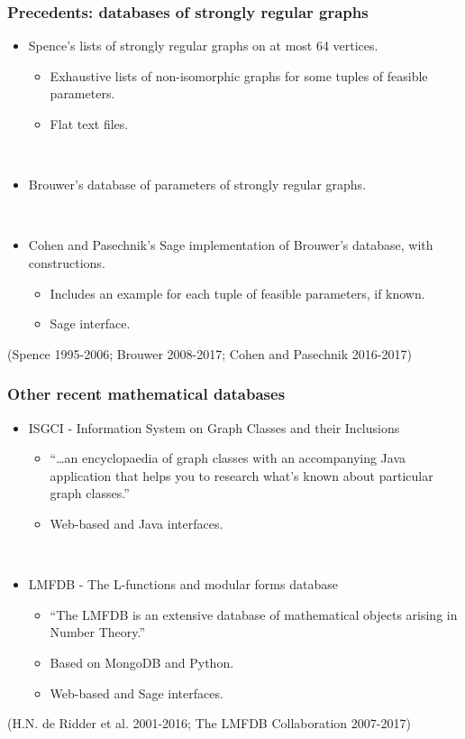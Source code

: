 \documentclass[pdf,sprung,slideColor,nocolorBG]{beamer}
\newenvironment{colortheme}[1]{
\def\ProvidesPackageRCS $##1${\relax}
\renewcommand{\ProcessOptions}{\relax}
\makeatletter

\makeatother
}{}
\newcommand{\slidecite}[1]{\tiny{(#1)}\normalsize{}}
\begin{document}
\begin{colortheme}{seagull}
\begin{frame}
\frametitle{Precedents: databases of strongly regular graphs}
\begin{itemize}
 \item
Spence's lists of strongly regular graphs on at most 64 vertices.
 \begin{itemize}
  \item
Exhaustive lists of non-isomorphic graphs for some tuples of feasible parameters.
  \item
Flat text files.
 \end{itemize}

~

 \item
Brouwer's database of parameters of strongly regular graphs.

~

 \item
Cohen and Pasechnik's Sage implementation of Brouwer's database, with constructions.
 \begin{itemize}
  \item
Includes an example for each tuple of feasible parameters, if known.
  \item
Sage interface.
 \end{itemize}
\end{itemize}
\slidecite{Spence 1995-2006; Brouwer 2008-2017; Cohen and Pasechnik 2016-2017}
\end{frame}

\begin{frame}
\frametitle{Other recent mathematical databases}
\begin{itemize}
 \item
ISGCI - Information System on Graph Classes and their Inclusions
 \begin{itemize}
  \item
``\ldots an encyclopaedia of graph classes with an accompanying Java application that helps you to research what's known about particular graph classes.''
  \item
Web-based and Java interfaces.
 \end{itemize}

~

 \item
LMFDB - The L-functions and modular forms database
 \begin{itemize}
  \item
``The LMFDB is an extensive database of mathematical objects arising in Number Theory.''
  \item
Based on MongoDB and Python.
  \item
Web-based and Sage interfaces.
 \end{itemize}
\end{itemize}
\slidecite{H.N. de Ridder et al. 2001-2016; The LMFDB Collaboration 2007-2017}
\end{frame}

\end{colortheme}
\end{document}
